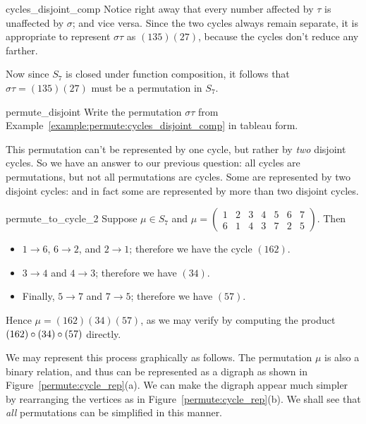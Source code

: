 \begin{example}{cycles_disjoint_comp}
Notice right away that every number affected by $\tau$ is unaffected by $\sigma$; and vice versa. Since the two cycles always  remain separate, it is appropriate to represent $\sigma \tau$ as $(135)(27)$, because the cycles don't reduce any farther.
\end{example}

Now since $S_7$ is closed under function composition, it follows that $\sigma \tau = (135)(27)$ must be a permutation in $S_7$.

\begin{exercise}{permute_disjoint}
Write the permutation $\sigma \tau$ from Example~\ref{example:permute:cycles_disjoint_comp} in tableau form.
\end{exercise}

This permutation can't be represented by one cycle, but rather by \emph{two} disjoint cycles.  So we have an answer to our previous question: all cycles are permutations, but not all permutations are cycles.  Some are represented by two disjoint cycles: and in fact some are represented by more than two disjoint cycles.

\begin{example}{permute_to_cycle_2}
Suppose $\mu \in S_7$ and $\mu = \begin{pmatrix} 1 & 2 & 3 & 4 & 5 & 6 & 7 \\ 6 & 1 & 4 & 3 & 7 & 2 & 5 \end{pmatrix}$.  Then
\begin{itemize}
\item
$1 \to 6$, $6 \to 2$, and $2 \to 1$;  therefore we have the cycle $(162)$.
\item
$3 \to 4$ and $4 \to 3$; therefore we have $(34)$. 
\item
Finally, $5 \to 7$ and $7 \to 5$; therefore we have $(57)$. 
\end{itemize}

\noindent
Hence $\mu = (162)(34)(57)$, as we may verify by computing the product $(162)\circ (34)\circ (57)$ directly.

We may represent this process graphically as follows. The permutation $\mu$ is also a binary relation, and thus can be represented as a digraph as shown in Figure~\ref{permute:cycle_rep}(a). We can make the digraph appear much simpler by rearranging the vertices as in Figure~\ref{permute:cycle_rep}(b). We shall see that \emph{all} permutations can be simplified in this manner.
\end{example}

